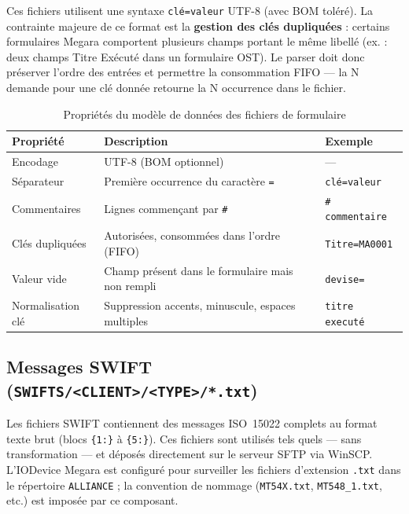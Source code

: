 \documentclass[12pt, a4paper]{report}
\begin{document}
Ces fichiers utilisent une syntaxe \texttt{clé=valeur} UTF-8 (avec BOM toléré). La contrainte majeure de ce format est la \textbf{gestion des clés dupliquées} : certains formulaires Megara comportent plusieurs champs portant le même libellé (ex. : deux champs \og{}Titre Exécuté\fg{} dans un formulaire OST). Le parser doit donc préserver l'ordre des entrées et permettre la consommation FIFO — la N\ieme{} demande pour une clé donnée retourne la N\ieme{} occurrence dans le fichier.

\begin{table}[H]
\centering
\caption{Propriétés du modèle de données des fichiers de formulaire}
\label{tab:datamodel}
\begin{tabularx}{\textwidth}{lXl}
\toprule
\textbf{Propriété} & \textbf{Description} & \textbf{Exemple} \\
\midrule
Encodage          & UTF-8 (BOM optionnel)                           & — \\
Séparateur        & Première occurrence du caractère \texttt{=}     & \texttt{clé=valeur} \\
Commentaires      & Lignes commençant par \texttt{\#}               & \texttt{\# commentaire} \\
Clés dupliquées   & Autorisées, consommées dans l'ordre (FIFO)      & \texttt{Titre=MA0001} \\
Valeur vide       & Champ présent dans le formulaire mais non rempli & \texttt{devise=} \\
Normalisation clé & Suppression accents, minuscule, espaces multiples & \texttt{titre executé} \\
\bottomrule
\end{tabularx}
\end{table}

\subsection{Messages SWIFT (\texttt{SWIFTS/<CLIENT>/<TYPE>/*.txt})}

Les fichiers SWIFT contiennent des messages ISO~15022 complets au format texte brut (blocs \texttt{\{1:\}} à \texttt{\{5:\}}). Ces fichiers sont utilisés tels quels — sans transformation — et déposés directement sur le serveur SFTP via WinSCP. L'IODevice Megara est configuré pour surveiller les fichiers d'extension \texttt{.txt} dans le répertoire \texttt{ALLIANCE} ; la convention de nommage (\texttt{MT54X.txt}, \texttt{MT548\_1.txt}, etc.) est imposée par ce composant.
\end{document}
